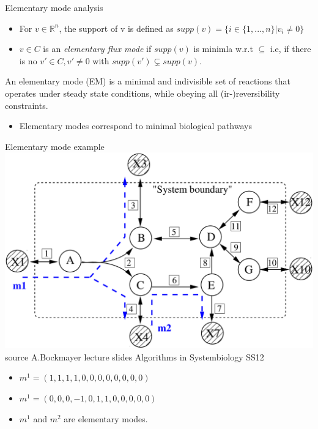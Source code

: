 \documentclass{beamer}
\begin{document}
\begin{frame}{Elementary mode analysis}
    \begin{itemize}
        \item For $v \in \mathbb{R}^n$, the support of v is defined as 
        $supp(v) = \{i \in \{1, ..., n \} | v_i \neq 0  \}$
    
        \item $v \in C$ is an \emph{elementary flux mode} if $supp(v)$
        is minimla w.r.t $\subseteq$
        i.e, if there is no $v' \in C, v' \neq 0$ with 
        $supp(v') \subsetneq supp(v)$.
    \end{itemize}
    
    
    \begin{definition}
        An elementary mode (EM) is a minimal and indivisible set 
        of reactions that operates under steady state conditions, 
        while obeying all (ir-)reversibility constraints.
    \end{definition}
    
    \begin{itemize}
    	\item Elementary modes correspond to minimal biological pathways
    \end{itemize}
    
\end{frame}
\begin{frame}{Elementary mode example}
    \includegraphics[width=.7\textwidth]{grafik/EMnet1}
    \\
    \hfill \tiny{source A.Bockmayer lecture slides Algorithms in Systembiology SS12}
    \normalsize
    \begin{itemize}
        \item $m^{1} = (1, 1, 1, 1, 0, 0, 0, 0, 0, 0, 0 ,0)$
        \item $m^{1} = (0, 0, 0, -1, 0, 1, 1, 0, 0, 0, 0 ,0)$
        \item $m^{1}$ and $m^{2}$ are elementary modes.
    \end{itemize}
\end{frame}
\end{document}
